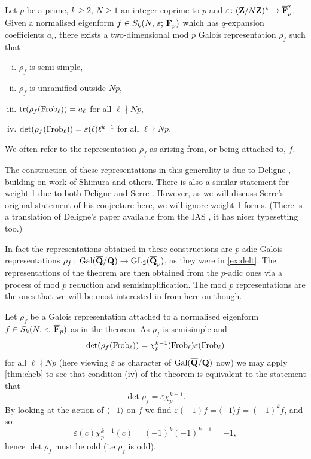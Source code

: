\documentclass[a4paper,12pt]{article}
\begin{document}
\begin{thm}[Deligne]\label{thm:assoc}
Let $p$ be a prime, $k \ge 2$, $N \ge 1$ an integer coprime to $p$ and $\varepsilon\colon (\mathbf{Z}/N\mathbf{Z})^* \to \overline{\mathbf{F}}_p^*$. Given a normalised eigenform $f\in S_k(N,\,\varepsilon;\,\overline{\mathbf{F}}_p)$ which has $q$-expansion coefficients $a_i$, there exists a two-dimensional mod $p$ Galois representation $\rho_f$ such that
\begin{enumerate}[(i)]
\item $\rho_f$ is semi-simple,
\item $\rho_f$ is unramified outside $Np$,
\item $\operatorname{tr}(\rho_f (\operatorname{Frob}_\ell)) = a_\ell$ for all $\ell \nmid Np$,
\item $\det(\rho_f (\operatorname{Frob}_\ell)) = \varepsilon(\ell)\ell^{k-1}$ for all $\ell \nmid Np$.
\end{enumerate}
We often refer to the representation $\rho_f$ as arising from, or being attached to, $f$.
\end{thm}

The construction of these representations in this generality is due to Deligne \cite{Deligne}, building on work of Shimura and others.
There is also a similar statement for weight 1 due to both Deligne and Serre \cite{DeligneSerre}.
However, as we will discuss Serre's original statement of his conjecture here, we will ignore weight 1 forms.
(There is a translation of Deligne's paper available from the IAS \cite{DeligneEng}, it has nicer typesetting too.)

In fact the representations obtained in these constructions are $p$-adic Galois representations $\rho_f\colon \operatorname{Gal}(\overline{\mathbf{Q}}/\mathbf{Q}) \to \operatorname{GL}_2(\overline{\mathbf{Q}}_p)$, as they were in \cref{ex:delt}.
The representations of the theorem are then obtained from the $p$-adic ones via a process of mod $p$ reduction and semisimplification.
The mod $p$ representations are the ones that we will be most interested in from here on though.


\begin{rmk}\label{rmk:detrho}
Let $\rho_f$ be a Galois representation attached to a normalised eigenform $f\in S_k(N,\,\varepsilon;\,\overline{\mathbf{F}}_p)$ as in the theorem.
As $\rho_f$ is semisimple and
\[
\det(\rho_f(\operatorname{Frob}_\ell)) = \chi_p^{k-1}(\operatorname{Frob}_\ell)\varepsilon(\operatorname{Frob}_\ell)
\]
for all $\ell \nmid Np$ (here viewing $\varepsilon$ as character of $\operatorname{Gal}(\overline{\mathbf{Q}}/\mathbf{Q})$ now) we may apply \cref{thm:cheb} to see that condition (iv) of the theorem is equivalent to the statement that
\[
\det\rho_f = \varepsilon\chi_p^{k-1}.
\]
By looking at the action of $\langle-1\rangle$ on $f$ we find $\varepsilon(-1)f = \langle -1 \rangle f = (-1)^k f$, and so
\[
\varepsilon(c)\chi_p^{k-1}(c) = (-1)^k(-1)^{k-1} = -1,
\]
hence $\det\rho_f$ must be odd (i.e $\rho_f$ is odd).
\end{rmk}
\end{document}
